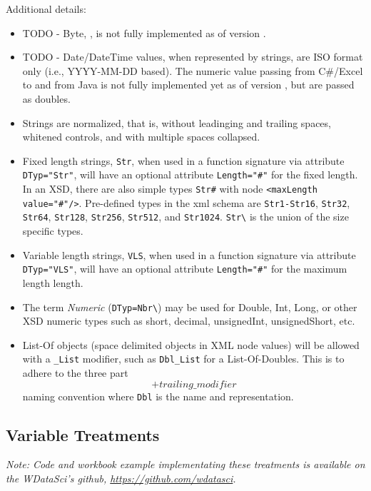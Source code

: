 \documentclass[10pt]{article}
\begin{document}
Additional details:
\begin{itemize}
    \item TODO - Byte, , is not fully implemented as of version \thisversion. 
    \item TODO - Date/DateTime values, when represented by strings, are ISO format only (i.e., YYYY-MM-DD based). The numeric value passing
        from C\#/Excel to and from Java is not fully implemented yet as of version \thisversion, but are passed as doubles.
    \item Strings are normalized, that is, without leadinging and trailing spaces, whitened controls, and with multiple spaces collapsed.
    \item Fixed length strings, \verb+Str+, when used in a function signature via attribute \verb+DTyp="Str"+, will have an optional
        attribute \verb+Length="#"+ for the fixed length.  In an XSD, there are also simple types \verb+Str#+ with node 
        \verb+<maxLength value="#"/>+.  Pre-defined types in the xml schema are 
        \verb+Str1-Str16+, \verb+Str32+, \verb+Str64+, \verb+Str128+, \verb+Str256+,
        \verb+Str512+, and \verb+Str1024+. \verb+Str\+ is the union of the size specific types.
    \item Variable length strings, \verb+VLS+, when used in a function signature via attribute \verb+DTyp="VLS"+, will have an optional
        attribute \verb+Length="#"+ for the maximum length length.
    \item The term {\em Numeric} (\verb+DTyp=Nbr\+) may be used for Double, Int, Long, or other XSD numeric types such as short, decimal,
        unsignedInt, unsignedShort, etc.
    \item List-Of objects (space delimited objects in XML node values) will be allowed with a \verb+_List+ modifier, such as 
        \verb+Dbl_List+ for a List-Of-Doubles. This is to adhere to the three part \[+ trailing \_ modifier\] naming convention where
        \verb+Dbl+ is the name and representation.
\end{itemize}




\subsection{Variable Treatments\label{treatments}\label{hats}}

{\em Note:  Code and workbook example implementating these treatments is available on the WDataSci's github,
\url{https://github.com/wdatasci}.}
\end{document}

